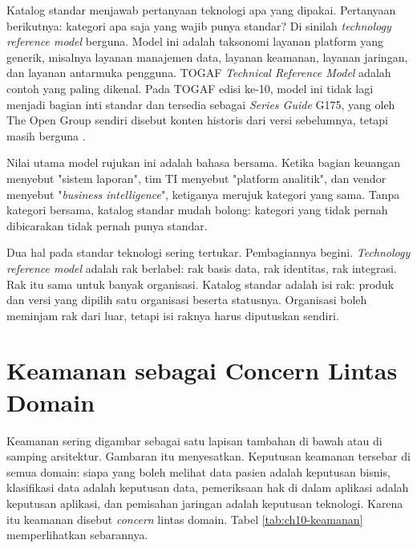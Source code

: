 Katalog standar menjawab pertanyaan teknologi apa yang dipakai. Pertanyaan
berikutnya: kategori apa saja yang wajib punya standar? Di sinilah
\textit{technology reference model} berguna. Model ini adalah taksonomi
layanan platform yang generik, misalnya layanan manajemen data, layanan
keamanan, layanan jaringan, dan layanan antarmuka pengguna. TOGAF
\textit{Technical Reference Model} adalah contoh yang paling dikenal. Pada
TOGAF edisi ke-10, model ini tidak lagi menjadi bagian inti standar dan
tersedia sebagai \textit{Series Guide} G175, yang oleh The Open Group sendiri
disebut konten historis dari versi sebelumnya, tetapi masih berguna
\cite{c10-togaf-trm}.

Nilai utama model rujukan ini adalah bahasa bersama. Ketika bagian keuangan
menyebut "sistem laporan", tim TI menyebut "platform analitik", dan vendor
menyebut "\textit{business intelligence}", ketiganya merujuk kategori yang
sama. Tanpa kategori bersama, katalog standar mudah bolong: kategori yang
tidak pernah dibicarakan tidak pernah punya standar.

Dua hal pada standar teknologi sering tertukar. Pembagiannya begini.
\textit{Technology reference model} adalah rak berlabel: rak basis data, rak
identitas, rak integrasi. Rak itu sama untuk banyak organisasi. Katalog
standar adalah isi rak: produk dan versi yang dipilih satu organisasi beserta
statusnya. Organisasi boleh meminjam rak dari luar, tetapi isi raknya harus
diputuskan sendiri.

\section{Keamanan sebagai Concern Lintas Domain}

Keamanan sering digambar sebagai satu lapisan tambahan di bawah atau di
samping arsitektur. Gambaran itu menyesatkan. Keputusan keamanan tersebar di
semua domain: siapa yang boleh melihat data pasien adalah keputusan bisnis,
klasifikasi data adalah keputusan data, pemeriksaan hak di dalam aplikasi
adalah keputusan aplikasi, dan pemisahan jaringan adalah keputusan teknologi.
Karena itu keamanan disebut \textit{concern} lintas domain. Tabel
\ref{tab:ch10-keamanan} memperlihatkan sebarannya.


